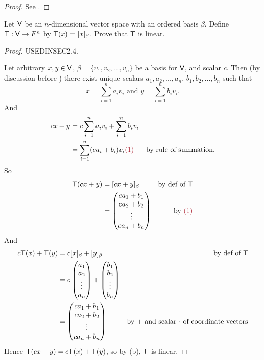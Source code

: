 \begin{proof}
See .
\end{proof}

\begin{exercise} \label{exercise 2.2.8}
Let \(\textsf{V}\) be an \(n\)-dimensional vector space with an ordered basis \(\beta\).
Define \(\textsf{T} : \textsf{V} \to F^n\) by \(\textsf{T}(x) = [x]_{\beta}\).
Prove that \(\textsf{T}\) is linear.
\end{exercise}

\begin{proof}
USEDINSEC2.4.

Let arbitrary \(x, y \in \textsf{V}\), \(\beta = \{ v_1, v_2, ..., v_n \}\) be a basis for \(\textsf{V}\), and scalar \(c\).
Then (by discussion before ) there exist unique scalars \(a_1, a_2, ..., a_n\), \(b_1, b_2, ..., b_n\) such that
\[
    x = \sum_{i = 1}^n a_i v_i \text{ and } y = \sum_{i = 1}^n b_i v_i.
\]
And
\begin{align*}
    cx + y & = c\sum_{i = 1}^n a_i v_i + \sum_{i = 1}^n b_i v_i \\
           & = \sum_{i = 1}^n (ca_i + b_i) v_i \MAROON{(1)} & \text{by rule of summation}.
\end{align*}
So
\begin{align*}
    \T(cx + y) & = [cx + y]_{\beta} & \text{by def of \(\T\)} \\
               & = \begin{pmatrix} ca_1 + b_1 \\ ca_2 + b_2 \\ \vdots \\ ca_n + b_n \end{pmatrix} & \text{by \MAROON{(1)}}
\end{align*}
And
\begin{align*}
    c\textsf{T}(x) + \textsf{T}(y) & = c[x]_{\beta} + [y]_{\beta} & \text{by def of \(\textsf{T}\)} \\
                   & = c \begin{pmatrix}
                        a_1 \\ a_2 \\ \vdots \\ a_n
                    \end{pmatrix}
                    + \begin{pmatrix}
                        b_1 \\ b_2 \\ \vdots \\ b_n
                    \end{pmatrix} \\
                   & = \begin{pmatrix} ca_1 + b_1 \\ ca_2 + b_2 \\ \vdots \\ ca_n + b_n \end{pmatrix} & \text{by \(+\) and scalar \(\cdot\) of coordinate vectors}
\end{align*}
Hence \(\textsf{T}(cx + y) = c\textsf{T}(x) + \textsf{T}(y)\), so by (b), \(\textsf{T}\) is linear.
\end{proof}


